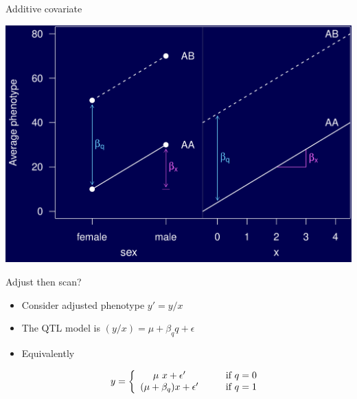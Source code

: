 \documentclass[12pt]{article}
\newcommand{\headsize}{\fontsize{35}{35} \selectfont}
\newcommand{\smallsize}{\fontsize{25}{30} \selectfont}
\begin{document}
\newpage

\headsize \color{myyellow}
\hfill \begin{minipage}{5.75in}
\centering
Additive covariate
\end{minipage}

\vfill

\centerline{\includegraphics{Figs/addcovar.pdf}}

\newpage

\headsize \color{myyellow}
\hfill \begin{minipage}{5.75in}
\centering
Adjust then scan?
\end{minipage}

\vspace{15mm}

\color{mywhite} \smallsize

\hspace{0.5in} \begin{minipage}{9.5in}
  \begin{itemize}
    \itemsep18pt
  \item Consider adjusted phenotype $y' = y/x$
  \item The QTL model is $(y/x) = \mu + \beta_q q + \epsilon$
  \item Equivalently

$$y = \left\{ \begin{array}{c@{\hspace{1cm}}l} \mu \ x + \epsilon' & \text{if
      $q = 0$} \\
    (\mu + \beta_q) x + \epsilon' & \text{if $q =
      1$} \end{array} \right. $$
\end{itemize}
\end{minipage}
\end{document}

